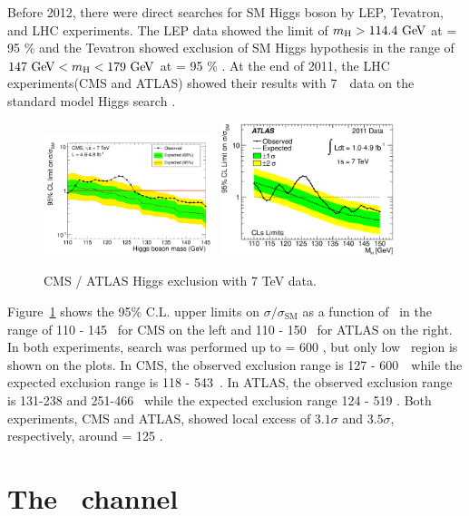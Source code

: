 Before 2012, there were direct searches for SM Higgs boson by LEP, Tevatron, 
and LHC experiments. 
The LEP data showed the limit of $m_{\mathrm{H}}>114.4~\mathrm{Ge\kern -0.1em V}$ at \CLs = 95 \% \cite{Beringer:1900zz} 
and the Tevatron showed exclusion of SM Higgs hypothesis in the range of 
$147~\mathrm{Ge\kern -0.1em V} < m_{\mathrm{H}} < 179~\mathrm{Ge\kern -0.1em V}$ at \CLs = 95 \% \cite{Beringer:1900zz}. 
At the end of 2011, the LHC experiments(CMS and ATLAS) showed their results with 7~\TeV\ data
on the standard model Higgs search \cite{Chatrchyan201226,Aad201249}. 
\begin{figure}[htp]
\centering
\includegraphics[width=0.45\textwidth]{figures/cls_comb_zoom.pdf}
\includegraphics[width=0.45\textwidth]{figures/fig_05b.eps}
\caption{ CMS / ATLAS Higgs exclusion with 7 TeV data. }
\label{fig:2011HiggsExp}
\end{figure}
Figure~\ref{fig:2011HiggsExp} shows the 95\% C.L. upper limits on $\sigma/\sigma_{\textrm{SM}}$
as a function of \mHi\ in the range of 110 - 145 \GeV\ for CMS on the left and 
110 - 150 \GeV\ for ATLAS on the right. In both experiments, search was performed up to 
\mHi = 600 \GeV, but only low \mHi\ region is shown on the plots. 
In CMS, the observed exclusion range is 127 - 600~\GeV\ 
while the expected exclusion range is 118 - 543~\GeV.     
In ATLAS, the observed exclusion range is 131-238 and 251-466 \GeV\ 
while the expected exclusion range 124 - 519 \GeV.  
Both experiments, CMS and ATLAS, showed local excess of 
$3.1\sigma$ and $3.5\sigma$, respectively, around \mHi = 125 \GeV. 

 

\newpage
\section{The \hww\ channel} 

